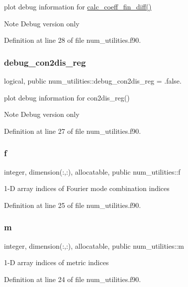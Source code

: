 plot debug information for \hyperlink{namespacenum__utilities_a4dffe3beba7165dd17cff19a99a9e2ac}{calc\+\_\+coeff\+\_\+fin\+\_\+diff()} 

\begin{DoxyNote}{Note}
Debug version only 
\end{DoxyNote}


Definition at line 28 of file num\+\_\+utilities.\+f90.

\mbox{\label{namespacenum__utilities_ab7138a230a3c494c7a2b71b2a7fffc0a}} 
\subsubsection{\texorpdfstring{debug\+\_\+con2dis\+\_\+reg}{debug\_con2dis\_reg}}
{\footnotesize\ttfamily logical, public num\+\_\+utilities\+::debug\+\_\+con2dis\+\_\+reg = .false.}



plot debug information for con2dis\+\_\+reg() 

\begin{DoxyNote}{Note}
Debug version only 
\end{DoxyNote}


Definition at line 27 of file num\+\_\+utilities.\+f90.

\mbox{\label{namespacenum__utilities_a8e3399292fcb3a5fc35ae87f7811bbb5}} 
\subsubsection{\texorpdfstring{f}{f}}
{\footnotesize\ttfamily integer, dimension(\+:,\+:), allocatable, public num\+\_\+utilities\+::f}



1-\/D array indices of Fourier mode combination indices 



Definition at line 25 of file num\+\_\+utilities.\+f90.

\mbox{\label{namespacenum__utilities_ad7a7ae2abf02a2df9e00b2aca669617c}} 
\subsubsection{\texorpdfstring{m}{m}}
{\footnotesize\ttfamily integer, dimension(\+:,\+:), allocatable, public num\+\_\+utilities\+::m}



1-\/D array indices of metric indices 



Definition at line 24 of file num\+\_\+utilities.\+f90.


